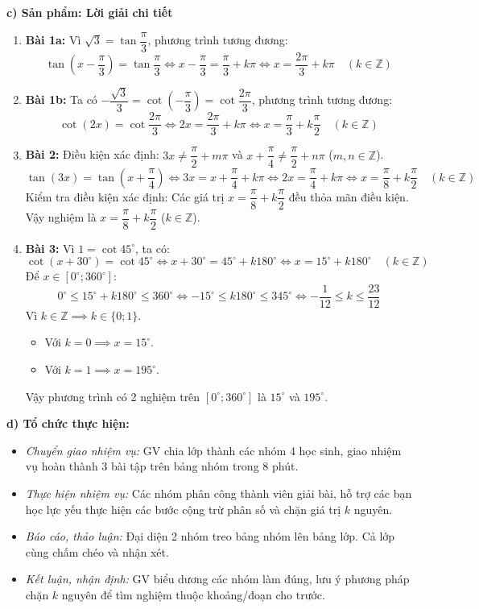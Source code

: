 \documentclass[12pt, a4paper]{article}
\begin{document}
\noindent \textbf{c) Sản phẩm: Lời giải chi tiết}  
\begin{enumerate}[leftmargin=0.6cm]  
    \item \textbf{Bài 1a:} Vì $\sqrt{3} = \tan\dfrac{\pi}{3}$, phương trình tương đương:  
    $$\tan\left(x - \dfrac{\pi}{3}\right) = \tan\dfrac{\pi}{3} \iff x - \dfrac{\pi}{3} = \dfrac{\pi}{3} + k\pi \iff x = \dfrac{2\pi}{3} + k\pi \quad (k \in \mathbb{Z})$$  
    \item \textbf{Bài 1b:} Ta có $-\dfrac{\sqrt{3}}{3} = \cot\left(-\dfrac{\pi}{3}\right) = \cot\dfrac{2\pi}{3}$, phương trình tương đương:  
    $$\cot(2x) = \cot\dfrac{2\pi}{3} \iff 2x = \dfrac{2\pi}{3} + k\pi \iff x = \dfrac{\pi}{3} + k\dfrac{\pi}{2} \quad (k \in \mathbb{Z})$$  
    \item \textbf{Bài 2:} Điều kiện xác định: $3x \neq \dfrac{\pi}{2} + m\pi$ và $x + \dfrac{\pi}{4} \neq \dfrac{\pi}{2} + n\pi$ ($m, n \in \mathbb{Z}$).  
    $$\tan(3x) = \tan\left(x + \dfrac{\pi}{4}\right) \iff 3x = x + \dfrac{\pi}{4} + k\pi \iff 2x = \dfrac{\pi}{4} + k\pi \iff x = \dfrac{\pi}{8} + k\dfrac{\pi}{2} \quad (k \in \mathbb{Z})$$  
    Kiểm tra điều kiện xác định: Các giá trị $x = \dfrac{\pi}{8} + k\dfrac{\pi}{2}$ đều thỏa mãn điều kiện. Vậy nghiệm là $x = \dfrac{\pi}{8} + k\dfrac{\pi}{2}$ ($k \in \mathbb{Z}$).  
    \item \textbf{Bài 3:} Vì $1 = \cot 45^\circ$, ta có:  
    $$\cot\left(x + 30^\circ\right) = \cot 45^\circ \iff x + 30^\circ = 45^\circ + k180^\circ \iff x = 15^\circ + k180^\circ \quad (k \in \mathbb{Z})$$  
    Để $x \in [0^\circ; 360^\circ]$:  
    $$0^\circ \le 15^\circ + k180^\circ \le 360^\circ \iff -15^\circ \le k180^\circ \le 345^\circ \iff -\dfrac{1}{12} \le k \le \dfrac{23}{12}$$  
    Vì $k \in \mathbb{Z} \implies k \in \{0; 1\}$.  
    \begin{itemize}  
        \item Với $k = 0 \implies x = 15^\circ$.  
        \item Với $k = 1 \implies x = 195^\circ$.  
    \end{itemize}  
    Vậy phương trình có 2 nghiệm trên $[0^\circ; 360^\circ]$ là $15^\circ$ và $195^\circ$.  
\end{enumerate}  
  
\noindent \textbf{d) Tổ chức thực hiện:}  
\begin{itemize}[leftmargin=0.8cm]  
    \item \textit{Chuyển giao nhiệm vụ:} GV chia lớp thành các nhóm 4 học sinh, giao nhiệm vụ hoàn thành 3 bài tập trên bảng nhóm trong 8 phút.  
    \item \textit{Thực hiện nhiệm vụ:} Các nhóm phân công thành viên giải bài, hỗ trợ các bạn học lực yếu thực hiện các bước cộng trừ phân số và chặn giá trị $k$ nguyên.  
    \item \textit{Báo cáo, thảo luận:} Đại diện 2 nhóm treo bảng nhóm lên bảng lớp. Cả lớp cùng chấm chéo và nhận xét.  
    \item \textit{Kết luận, nhận định:} GV biểu dương các nhóm làm đúng, lưu ý phương pháp chặn $k$ nguyên để tìm nghiệm thuộc khoảng/đoạn cho trước.  
\end{itemize}  
  
\end{document}
